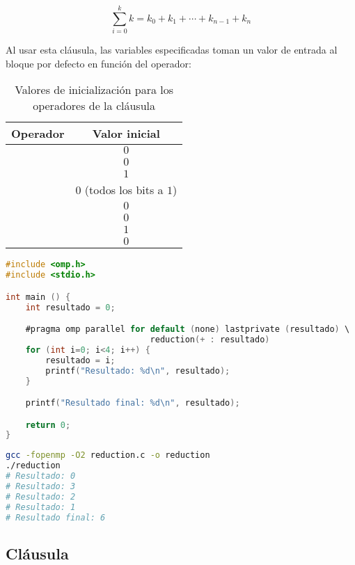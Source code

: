 \[\sum_{i=0}^{k}k=k_0+k_1+\cdots+k_{n-1}+k_n\]

Al usar esta cláusula, las variables especificadas toman un valor de entrada al bloque por defecto en función del operador:

\begin{table}[!h]
\begin{center}
\begin{tabular}{c c}
	\textbf{Operador} & \textbf{Valor inicial}     \\
	\toprule
	\code{+}          & $0$                        \\
	\code{-}          & $0$                        \\
	\code{*}          & $1$                        \\
	\code{\&}         & $0$ (todos los bits a $1$) \\
	\code{|}          & $0$                        \\
	\code{\^{}}       & $0$                        \\
	\code{\&\&}       & $1$                        \\
	\code{||}         & $0$                        \\
\end{tabular}
\end{center}
\caption{Valores de inicialización para los operadores de la cláusula }\label{clausulas-omp-reduction-valores-inicializacion}
\end{table}

\begin{lstlisting}[language=C]
#include <omp.h>
#include <stdio.h>

int main () {
	int resultado = 0;

	#pragma omp parallel for default (none) lastprivate (resultado) \
	                         reduction(+ : resultado)
	for (int i=0; i<4; i++) {
		resultado = i;
		printf("Resultado: %d\n", resultado);
	}

	printf("Resultado final: %d\n", resultado);

	return 0;
}
\end{lstlisting}

\begin{lstlisting}[language=sh]
gcc -fopenmp -O2 reduction.c -o reduction
./reduction
# Resultado: 0
# Resultado: 3
# Resultado: 2
# Resultado: 1
# Resultado final: 6
\end{lstlisting}

\subsection{Cláusula }

